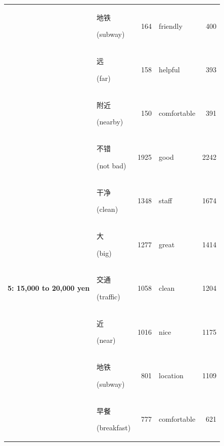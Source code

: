 \documentclass[smallextended,natbib]{svjour3}       %
\begin{document}
\begin{table}[ht]
{\begin{tabular}{|c|lr|lr|}
                                                             & \begin{CJK}{UTF8}{gbsn}地铁\end{CJK} (subway)          & 164   & friendly    & 400   \\  
                                                             & \begin{CJK}{UTF8}{gbsn}远\end{CJK} (far)              & 158   & helpful     & 393   \\  
                                                             & \begin{CJK}{UTF8}{gbsn}附近\end{CJK} (nearby)          & 150   & comfortable & 391   \\ \hline
        \multirow{10}{*}{\textbf{5: 15,000 to 20,000 yen}}   & \begin{CJK}{UTF8}{gbsn}不错\end{CJK} (not bad)         & 1925  & good        & 2242  \\  
                                                             & \begin{CJK}{UTF8}{gbsn}干净\end{CJK} (clean)           & 1348  & staff       & 1674  \\  
                                                             & \begin{CJK}{UTF8}{gbsn}大\end{CJK} (big)              & 1277  & great       & 1414  \\  
                                                             & \begin{CJK}{UTF8}{gbsn}交通\end{CJK} (traffic)         & 1058  & clean       & 1204  \\  
                                                             & \begin{CJK}{UTF8}{gbsn}近\end{CJK} (near)             & 1016  & nice        & 1175  \\  
                                                             & \begin{CJK}{UTF8}{gbsn}地铁\end{CJK} (subway)          & 801   & location    & 1109  \\  
                                                             & \begin{CJK}{UTF8}{gbsn}早餐\end{CJK} (breakfast)       & 777   & comfortable & 621   \\  

\end{tabular}}
\end{table}
\end{document}
